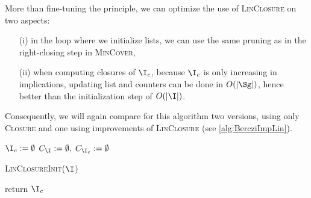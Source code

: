 \vspace{1.2em}

 More than fine-tuning the principle, we can optimize the use of \textsc{LinClosure} on two aspects:
\begin{itemize}
	\item[(i)] in the loop where we initialize lists, we can use the same
	pruning as in the right-closing step in \textsc{MinCover},
	\item[(ii)] when computing closures of $\I_c$, because $\I_c$ is only
	increasing in implications, updating list and counters can be done in $O(|\Sg|)$,	hence better than the initialization step of $O(|\I|)$.
\end{itemize}
\noindent Consequently, we will again compare for this algorithm two versions, using only \textsc{Closure} and one using improvements of \textsc{LinClosure} (see \ref{alg:BercziImpLin}).

\vspace{1.2em}

\begin{algorithm}[H]
	
	\BlankLine
	\BlankLine
	
	$\I_c := \emptyset$ \;
	$C_{\I} := \emptyset, \; C_{\I_c} := \emptyset $ \;
	
	\textsc{LinClosureInit}($\I$) \;
	
	
	\BlankLine
	
	
	\BlankLine
	
	return $\I_c$ \;
	
	\label{alg:BercziImpLin}
\end{algorithm}

\vspace{1.2em}

